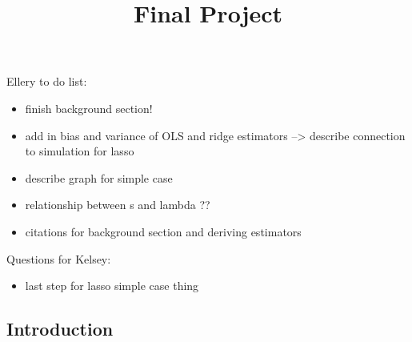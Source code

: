 \documentclass[
]{article}
\title{Final Project}
\author{}
\date{\vspace{-2.5em}}
\providecommand{\tightlist}{%
  \setlength{\itemsep}{0pt}\setlength{\parskip}{0pt}}
\begin{document}
\maketitle

Ellery to do list:

\begin{itemize}
\tightlist
\item
  finish background section!
\item
  add in bias and variance of OLS and ridge estimators --\textgreater{}
  describe connection to simulation for lasso
\item
  describe graph for simple case
\item
  relationship between s and lambda ??
\item
  citations for background section and deriving estimators
\end{itemize}

Questions for Kelsey:

\begin{itemize}
\tightlist
\item
  last step for lasso simple case thing
\end{itemize}

\hypertarget{introduction}{%
\subsection{Introduction}\label{introduction}}
\end{document}
